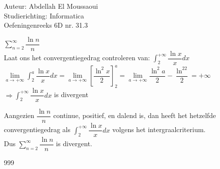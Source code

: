 \documentclass[a4paper]{article}
\begin{document}
  
\noindent \large Auteur: Abdellah El Moussaoui \\
\noindent \large Studierichting: Informatica\\
\noindent \large Oefeningenreeks 6D nr. 31.3\\

\medskip

\normalsize


$\displaystyle\sum_{n=2}^{\infty}\dfrac{\ln{n}}{n}$\\

Laat ons het convergentiegedrag controleren van: $\displaystyle\int^{+\infty}_2\dfrac{\ln{x}}{x}dx$\\

$ \lim\limits_{a\to+\infty} \displaystyle\int^a_2\dfrac{\ln{x}}{x}dx = 
\lim\limits_{a\to+\infty} \left[ \dfrac{\ln^2x}{2}\right]^a_2 = \lim\limits_{a\to+\infty} \dfrac{\ln^2{a}}{2}-\dfrac{\ln^22}{2} = +\infty$\\

$\Rightarrow \displaystyle\int^{+\infty}_2\dfrac{\ln{x}}{x}dx$ is divergent

Aangezien $\dfrac{\ln{n}}{n}$ continue, positief, en dalend is, dan heeft het hetzelfde convergentiegedrag als $\displaystyle\int^{+\infty}_2\dfrac{\ln{x}}{x}dx$ volgens het intergraalcriterium.\\

Dus $\displaystyle\sum_{n=2}^{\infty}\dfrac{\ln{n}}{n}$ is divergent.\\

\begin{thebibliography}{999}
\end{thebibliography}
\end{document}
